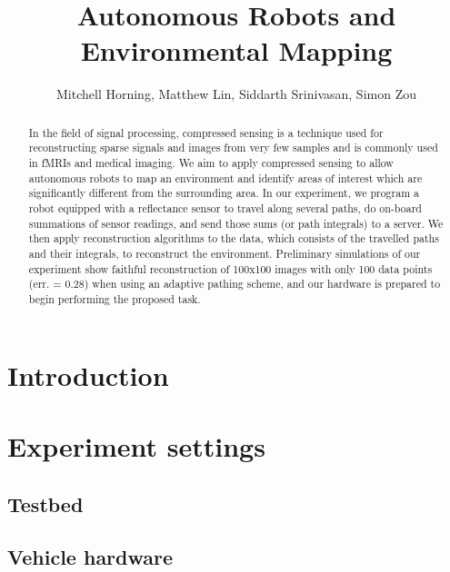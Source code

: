 \documentclass[english]{article}\usepackage[]{graphicx}\usepackage[]{color}
\begin{document}
\title{Autonomous Robots and Environmental Mapping}

\author{Mitchell Horning, Matthew Lin, Siddarth Srinivasan, Simon Zou}

\maketitle

\begin{abstract}

In the field of signal processing, compressed sensing is a technique used for 
reconstructing sparse signals and images from very few samples and is commonly 
used in fMRIs and medical imaging. We aim to apply compressed sensing to allow 
autonomous robots to map an environment and identify areas of interest which 
are significantly different from the surrounding area. In our experiment, we 
program a robot equipped with a reflectance sensor to travel along several 
paths, do on-board summations of sensor readings, and send those sums (or path 
integrals) to a server. We then apply reconstruction algorithms to the data,  
which consists of the travelled paths and their integrals, to reconstruct the 
environment. Preliminary simulations of our experiment show faithful 
reconstruction of 100x100 images with only 100 data points (err. = 0.28) when 
using an adaptive pathing scheme, and our hardware is prepared to begin 
performing the proposed task.


\end{abstract}

\tableofcontents

\section{Introduction}

\begin{comment}
Discuss Compressed Sensing

\end{comment}

\section{Experiment settings}
\subsection{Testbed}
\subsection{Vehicle hardware}
\end{document}
